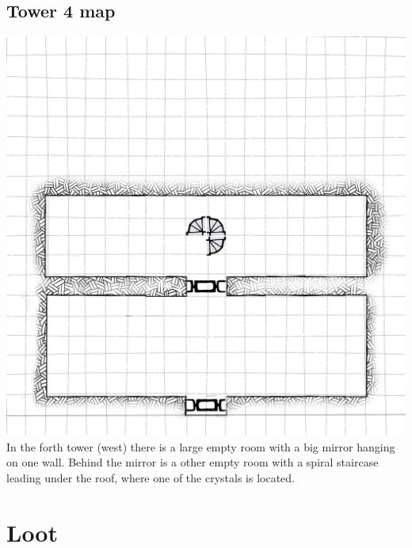 \documentclass[a4paper,10pt,twoside,twocolumn,bg=print]{dndbook} %
\begin{document}
		\subsection{Tower 4 map}
		\includegraphics[width=\linewidth]{Tower4.png}
		\vspace*{4cm}\linebreak
		In the forth tower (west) there is a large empty room with a big mirror hanging on one wall. Behind the mirror is a other empty room with a spiral staircase leading under the roof, where one of the crystals is located.
		\vfill
		\pagebreak
	\section{Loot}
\end{document}
